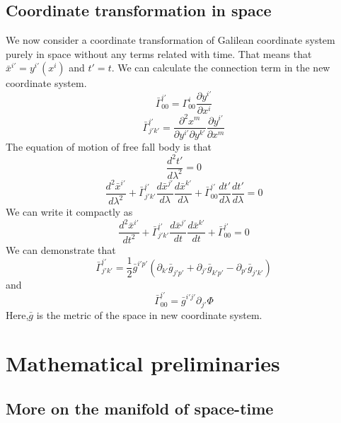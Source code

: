 \documentclass{article}
\begin{document}
\subsection{Coordinate transformation in space}
We now consider a coordinate transformation of Galilean coordinate system purely in space without any terms related with time. That means that $\bar{x}^{i'} = y^{i'}(x^{i})$ and $t'=t$. We can calculate the connection term in the new coordinate system.
\[\bar{\Gamma}^{i'}_{00} = \Gamma^{i}_{00} \frac{\partial y^{i'}}{\partial x^{i}}\]
\[\bar{\Gamma}^{i'}_{j'k'} = \frac{\partial^2 x^{m}}{\partial y^{i'}\partial y^{k'}} \frac{\partial y^{i'}}{\partial x^{m}}\]
The equation of motion of free fall body is that
\[\frac{d^2 t'}{d\lambda^2} = 0\]
\[\frac{d^2 \bar{x}^{i'}}{d\lambda^2} + \bar{\Gamma}^{i'}_{j' k'} \frac{d\bar{x}^{j'}}{d \lambda} \frac{d\bar{x}^{k'}}{d \lambda} + \bar{\Gamma}^{i'}_{0 0} \frac{dt'}{d \lambda} \frac{dt'}{d \lambda}=0\]
We can write it compactly as 
\[\frac{d^2 \bar{x}^{i'}}{dt^2} + \bar{\Gamma}^{i'}_{j' k'} \frac{d\bar{x}^{j'}}{dt} \frac{d\bar{x}^{k'}}{dt} + \bar{\Gamma}^{i'}_{0 0}=0\]
We can demonstrate that
\[\bar{\Gamma}^{i'}_{j'k'} = \frac{1}{2} \bar{g}^{i'p'}(\partial_{k'}\bar{g}_{j'p'}+\partial_{j'}\bar{g}_{k'p'}-\partial_{p'}\bar{g}_{j'k'})\]
and
\[\bar{\Gamma}^{i'}_{00} = \bar{g}^{i'j'}\partial_{j'}\Phi\]
Here,$\bar{g}$ is the metric of the space in new coordinate system.

\section{Mathematical preliminaries}
\subsection{More on the manifold of space-time}
\end{document}
